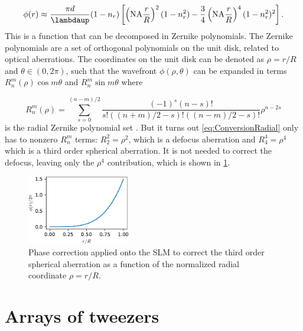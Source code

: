 \begin{equation}\label{eq:ConversionRadial}
    \phi(r) \approx \frac{\pi d}{\lambdaup}(1-n_r)\left[
    \left(\text{NA}\frac{r}{R}\right)^2(1-n_r^2)-\frac{3}{4}\left(\text{NA}\frac{r}{ R}\right)^4(1-n_r^2)^2
    \right].
\end{equation}
This is a function that can be decomposed in Zernike polynomials.
The Zernike polynomials are a set of orthogonal polynomials on the unit disk, related to optical aberrations. 
The coordinates on the unit disk can be denoted as $\rho = r/R$ and $\theta \in (0, 2\pi)$, such that the wavefront $\phi(\rho,\theta)$ can be expanded in terms $R_n^m(\rho)\cos{m\theta}$ and $R_n^m\sin{m\theta}$ where 

\begin{equation}\label{eq:ZernikeRadial}
    R_{n}^{m}(\rho)=
    \sum_{s=0}^{(n-m) / 2}
    \frac{(-1)^{s}(n-s) !}{s !\left((n+m)/2-s\right) !\left((n-m)/2-s\right) !} \rho^{n-2 s}
\end{equation}
is the radial Zernike polynomial set \cite{Mahajan94}. But it turns out \cref{eq:ConversionRadial} only has to nonzero $R_n^m$ terms: $R_2^2 = \rho^2$, which is a defocus aberration and $R_4^4 =\rho^4$ which is a third order spherical aberration. It is not needed to correct the defocus, leaving only the $\rho^4$ contribution, which is shown in \cref{fig:AberrationTerm}.

\begin{figure}
    \centering
    \includegraphics[width=0.4\textwidth]{figures/SphericalAberrationTerm.pdf}
    \caption{Phase correction applied onto the SLM to correct the third order spherical aberration as a function of the normalized radial coordinate $\rho=r/R$.}
    \label{fig:AberrationTerm}
\end{figure}




\section{Arrays of tweezers}\label{sec:ArraysResults}


